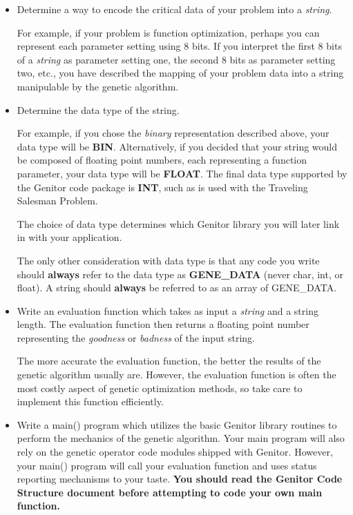 \begin{itemize}
 \item Determine a way to encode the critical data of your problem into
	   a {\it string}.  
	   
	   For example, if your problem is function optimization,
	   perhaps you can represent each parameter setting using 8 bits.
	   If you interpret the first 8 bits of a {\it string}
	   as parameter setting one, the second 8 bits as parameter setting
	   two, etc., you have described the mapping of your problem data into
	   a string manipulable by the genetic algorithm.

 \item Determine the data type of the string.  

	   For example, if you chose the {\it binary} representation 
	   described above, your data type will be {\bf BIN}.  Alternatively,
	   if you decided that your string would be composed of floating
	   point numbers, each representing a function parameter, your
	   data type will be {\bf FLOAT}.  The final data type supported
	   by the Genitor code package is {\bf INT}, such as is used with
	   the Traveling Salesman Problem.

	   The choice of data type determines which Genitor library 
	   you will later link in with your application.  

	   The only other consideration with data type is that any code
	   you write should {\bf always} refer to the data type as
	   {\bf GENE\_DATA} (never char, int, or float).  A string should
	   {\bf always} be referred to as an array of GENE\_DATA.

 \item Write an evaluation function which takes as input a {\it string}
	   and a string length.  The evaluation function then returns a
	   floating point number representing the {\it goodness} or
	   {\it badness} of the input string.  
	   
	   The more accurate the evaluation function, the better the results
	   of the genetic algorithm usually are.  However, the evaluation 
	   function is often the most costly aspect of genetic optimization
	   methods, so take care to implement this function efficiently.

 \item Write a main() program which utilizes the basic Genitor library
	   routines to perform the mechanics of the genetic algorithm.  Your
	   main program will also rely on the genetic operator code modules
	   shipped with Genitor.  However, your main() program will 
	   call your evaluation function and uses status reporting mechanisms
	   to your taste.  {\bf You should read the Genitor Code Structure
	   document before attempting to code your own main function.}


\end{itemize}
